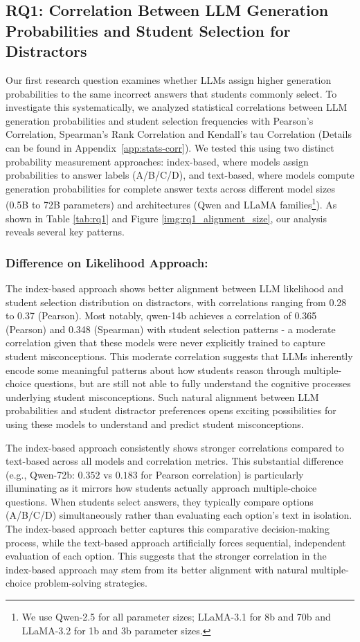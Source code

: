 \subsection{RQ1: Correlation Between LLM Generation Probabilities and Student Selection for Distractors}

Our first research question examines whether LLMs assign higher generation probabilities to the same incorrect answers that students commonly select. To investigate this systematically, we analyzed statistical correlations between LLM generation probabilities and student selection frequencies with Pearson's Correlation, Spearman's Rank Correlation and Kendall's tau Correlation (Details can be found in Appendix~\ref{app:stats-corr}). We tested this using two distinct probability measurement approaches: index-based, where models assign probabilities to answer labels (A/B/C/D), and text-based, where models compute generation probabilities for complete answer texts across different model sizes (0.5B to 72B parameters) and architectures (Qwen and LLaMA families\footnote{We use Qwen-2.5 for all parameter sizes; LLaMA-3.1 for 8b and 70b and LLaMA-3.2 for 1b and 3b parameter sizes.}). As shown in Table \ref{tab:rq1} and Figure \ref{img:rq1_alignment_size}, our analysis reveals several key patterns.

\subsubsection{Difference on Likelihood Approach:} The index-based approach shows better alignment between LLM likelihood and student selection distribution on distractors, with correlations ranging from 0.28 to 0.37 (Pearson). Most notably, qwen-14b achieves a correlation of 0.365 (Pearson) and 0.348 (Spearman) with student selection patterns - a moderate correlation given that these models were never explicitly trained to capture student misconceptions. This moderate correlation suggests that LLMs inherently encode some meaningful patterns about how students reason through multiple-choice questions, but are still not able to fully understand the cognitive processes underlying student misconceptions. Such natural alignment between LLM probabilities and student distractor preferences opens exciting possibilities for using these models to understand and predict student misconceptions.

The index-based approach consistently shows stronger correlations compared to text-based across all models and correlation metrics. This substantial difference (e.g., Qwen-72b: $0.352$ vs $0.183$ for Pearson correlation) is particularly illuminating as it mirrors how students actually approach multiple-choice questions. When students select answers, they typically compare options (A/B/C/D) simultaneously rather than evaluating each option's text in isolation. The index-based approach better captures this comparative decision-making process, while the text-based approach artificially forces sequential, independent evaluation of each option. This suggests that the stronger correlation in the index-based approach may stem from its better alignment with natural multiple-choice problem-solving strategies.


